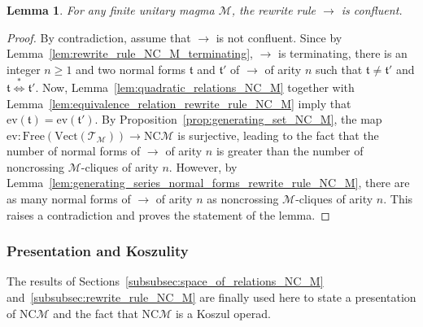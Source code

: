 \documentclass[10pt,reqno]{amsart}
\numberwithin{equation}{subsection}
\renewcommand{\geq}{\geqslant}
\newtheorem{Lemma}[Theorem]{Lemma}
\newcommand{\Mca}{\mathcal{M}}
\newcommand{\Tfr}{\mathfrak{t}}
\newcommand{\NC}{\mathrm{NC}}
\newcommand{\Vect}{\mathrm{Vect}}
\newcommand{\Rew}{\to}
\newcommand{\CRewTransSym}{\overset{*}{\Leftrightarrow}}
\newcommand{\Free}{\mathrm{Free}}
\newcommand{\Eval}{\mathrm{ev}}
\newcommand{\Triangles}{\mathcal{T}}
\begin{document}
\begin{Lemma} \label{lem:rewrite_rule_NC_M_confluent}
    For any finite unitary magma $\Mca$, the rewrite rule $\Rew$ is
    confluent.
\end{Lemma}
\begin{proof}
    By contradiction, assume that $\Rew$ is not confluent. Since by
    Lemma~\ref{lem:rewrite_rule_NC_M_terminating}, $\Rew$ is
    terminating, there is an integer $n \geq 1$ and two normal forms
    $\Tfr$ and $\Tfr'$ of $\Rew$ of arity $n$ such that $\Tfr \ne \Tfr'$
    and $\Tfr \CRewTransSym \Tfr'$. Now,
    Lemma~\ref{lem:quadratic_relations_NC_M} together with
    Lemma~\ref{lem:equivalence_relation_rewrite_rule_NC_M} imply that
    $\Eval(\Tfr) = \Eval(\Tfr')$. By
    Proposition~\ref{prop:generating_set_NC_M}, the map
    \begin{math}
        \Eval :
        \Free\left(\Vect\left(\Triangles_\Mca\right)\right)
        \to \NC\Mca
    \end{math}
    is surjective, leading to the fact that the number of normal forms
    of $\Rew$ of arity $n$ is greater than the number of noncrossing
    $\Mca$-cliques of arity $n$. However, by
    Lemma~\ref{lem:generating_series_normal_forms_rewrite_rule_NC_M},
    there are as many normal forms of $\Rew$ of arity $n$ as noncrossing
    $\Mca$-cliques of arity $n$. This raises a contradiction and proves
    the statement of the lemma.
\end{proof}
\medskip

\subsubsection{Presentation and Koszulity}
The results of Sections~\ref{subsubsec:space_of_relations_NC_M}
and~\ref{subsubsec:rewrite_rule_NC_M} are finally used here to state a
presentation of $\NC\Mca$ and the fact that $\NC\Mca$ is a Koszul
operad.
\medskip
\end{document}
